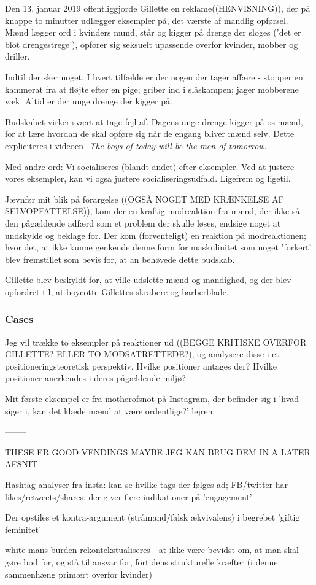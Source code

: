 Den 13. januar 2019 offentliggjorde Gillette en reklame((HENVISNING)), der på
knappe to minutter udlægger eksempler på, det værste af mandlig opførsel. Mænd
lægger ord i kvinders mund, står og kigger på drenge der sloges ('det er blot
drengestrege'), opfører sig seksuelt upassende overfor kvinder, mobber og
driller.

Indtil der sker noget. I hvert tilfælde er der nogen der tager affære - stopper
en kammerat fra at fløjte efter en pige; griber ind i slåskampen; jager
mobberene væk.  Altid er der unge drenge der kigger på.

Budskabet virker svært at tage fejl af. Dagens unge drenge kigger på os mænd,
for at lære hvordan de skal opføre sig når de engang bliver mænd selv.  Dette
expliciteres i videoen -\textit{The boys of today will be the men of tomorrow}.

Med andre ord: Vi socialiseres (blandt andet) efter eksempler. Ved at justere
vores eksempler, kan vi også justere socialiseringsudfald. Ligefrem og ligetil.

Jævnfør mit blik på forargelse ((OGSÅ NOGET MED KRÆNKELSE AF SELVOPFATTELSE)),
kom der en kraftig modreaktion fra mænd, der ikke så den pågældende adfærd som
et problem der skulle løses, endsige noget at undskylde og beklage for. Der kom
(forventeligt) en reaktion på modreaktionen; hvor det, at ikke kunne genkende
denne form for maskulinitet som noget 'forkert' blev fremstillet som bevis for,
at an behøvede dette budskab.

Gillette blev beskyldt for, at ville udslette mænd og mandighed, og der blev
opfordret til, at boycotte Gillettes skrabere og barberblade.

\subsubsection{Cases}

Jeg vil trække to eksempler på reaktioner ud ((BEGGE KRITISKE OVERFOR GILLETTE?
ELLER TO MODSATRETTEDE?), og analysere disse i et positioneringsteoretisk
perspektiv.  Hvilke positioner antages der? Hvilke positioner anerkendes i
deres pågældende miljø?

Mit første eksempel er fra motherofsnot på Instagram, der befinder sig i 'hvad
siger i, kan det klæde mænd at være ordentlige?' lejren.

—-----

THESE ER GOOD VENDINGS MAYBE JEG KAN BRUG DEM IN A LATER AFSNIT

Hashtag-analyser fra insta: kan se hvilke tags der følges ad; FB/twitter har
likes/retweets/shares, der giver flere indikationer på 'engagement'

Der opstiles et kontra-argument (stråmand/falsk ækvivalens) i begrebet 'giftig
feminitet'


white mans burden rekontekstualiseres - at ikke være bevidst om, at man skal
gøre bod for, og stå til ansvar for, fortidens strukturelle kræfter (i denne
sammenhæng primært overfor kvinder)
